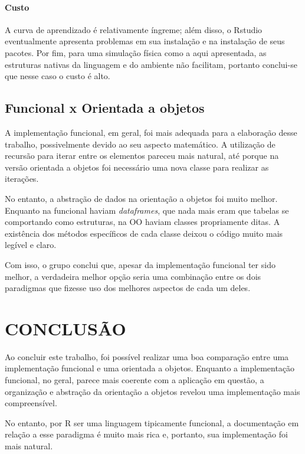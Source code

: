 \documentclass[rel_mlp]{iiufrgs}
\begin{document}
\subsubsection{Custo}
A curva de aprendizado é relativamente íngreme; além disso, o Rstudio eventualmente apresenta problemas em sua instalação e na instalação de seus pacotes. Por fim, para uma simulação física como a aqui apresentada, as estruturas nativas da linguagem e do ambiente não facilitam, portanto conclui-se que nesse caso o custo é alto.

\section{Funcional x Orientada a objetos}

A implementação funcional, em geral, foi mais adequada para a elaboração desse trabalho, possivelmente
devido ao seu aspecto matemático. A utilização de recursão para iterar entre os elementos pareceu mais
natural, até porque na versão orientada a objetos foi necessário uma nova classe para realizar as iterações.

No entanto, a abstração de dados na orientação a objetos foi muito melhor. Enquanto na funcional haviam \textit{dataframes},
que nada mais eram que tabelas se comportando como estruturas, na OO haviam classes propriamente ditas. A existência dos
métodos específicos de cada classe deixou o código muito mais legível e claro.

Com isso, o grupo conclui que, apesar da implementação funcional ter sido melhor, a verdadeira melhor opção seria
uma combinação entre os dois paradigmas que fizesse uso dos melhores aspectos de cada um deles.

%
\chapter{CONCLUSÃO}

Ao concluir este trabalho, foi possível realizar uma boa comparação entre uma implementação
funcional e uma orientada a objetos. Enquanto a implementação funcional, no geral, parece mais
coerente com a aplicação em questão, a organização e abstração da orientação a objetos revelou
uma implementação mais compreensível.

No entanto, por R ser uma linguagem tipicamente funcional, a documentação em relação a esse paradigma
é muito mais rica e, portanto, sua implementação foi mais natural.
\end{document}
